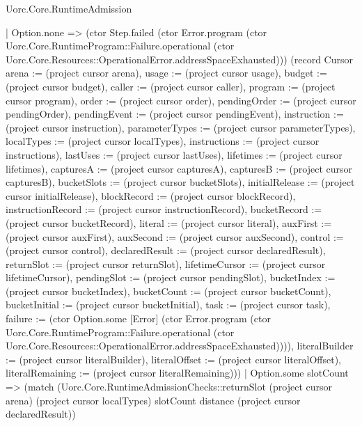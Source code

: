 \begin{lexlean}{Uorc.Core.RuntimeAdmission}
\begin{semanticmodule}
{            | Option.none => (ctor Step.failed (ctor Error.program (ctor Uorc.Core.RuntimeProgram::Failure.operational (ctor Uorc.Core.Resources::OperationalError.addressSpaceExhausted))) (record Cursor {arena := (project cursor arena), usage := (project cursor usage), budget := (project cursor budget), caller := (project cursor caller), program := (project cursor program), order := (project cursor order), pendingOrder := (project cursor pendingOrder), pendingEvent := (project cursor pendingEvent), instruction := (project cursor instruction), parameterTypes := (project cursor parameterTypes), localTypes := (project cursor localTypes), instructions := (project cursor instructions), lastUses := (project cursor lastUses), lifetimes := (project cursor lifetimes), capturesA := (project cursor capturesA), capturesB := (project cursor capturesB), bucketSlots := (project cursor bucketSlots), initialRelease := (project cursor initialRelease), blockRecord := (project cursor blockRecord), instructionRecord := (project cursor instructionRecord), bucketRecord := (project cursor bucketRecord), literal := (project cursor literal), auxFirst := (project cursor auxFirst), auxSecond := (project cursor auxSecond), control := (project cursor control), declaredResult := (project cursor declaredResult), returnSlot := (project cursor returnSlot), lifetimeCursor := (project cursor lifetimeCursor), pendingSlot := (project cursor pendingSlot), bucketIndex := (project cursor bucketIndex), bucketCount := (project cursor bucketCount), bucketInitial := (project cursor bucketInitial), task := (project cursor task), failure := (ctor Option.some [Error] (ctor Error.program (ctor Uorc.Core.RuntimeProgram::Failure.operational (ctor Uorc.Core.Resources::OperationalError.addressSpaceExhausted)))), literalBuilder := (project cursor literalBuilder), literalOffset := (project cursor literalOffset), literalRemaining := (project cursor literalRemaining)}))
            | Option.some slotCount => (match (Uorc.Core.RuntimeAdmissionChecks::returnSlot (project cursor arena) (project cursor localTypes) slotCount distance (project cursor declaredResult))
}
\end{semanticmodule}
\end{lexlean}
